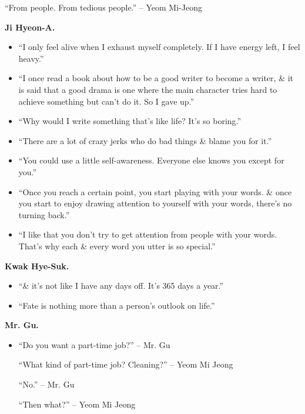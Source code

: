 \documentclass{article}
\begin{document}
\begin{enumerate}
\begin{itemize}
		``From people. From tedious people.'' -- Yeom Mi-Jeong
	\end{itemize}
	{\bf Ji Hyeon-A.}
	\begin{itemize}
		\item ``I only feel alive when I exhaust myself completely. If I have energy left, I feel heavy.''
		\item ``I once read a book about how to be a good writer to become a writer, \& it is said that a good drama is one where the main character tries hard to achieve something but can't do it. So I gave up.''
		\item ``Why would I write something that's like life? It's so boring.''
		\item ``There are a lot of crazy jerks who do bad things \& blame you for it.''
		\item ``You could use a little self-awareness. Everyone else knows you except for you.''
		\item ``Once you reach a certain point, you start playing with your words. \& once you start to enjoy drawing attention to yourself with your words, there's no turning back.''
		\item ``I like that you don't try to get attention from people with your words. That's why each \& every word you utter is so special.''
	\end{itemize}
	{\bf Kwak Hye-Suk.}
	\begin{itemize}
		\item ``\& it's not like I have any days off. It's 365 days a year.''
		\item ``Fate is nothing more than a person's outlook on life.''
	\end{itemize}
	{\bf Mr. Gu.}
	\begin{itemize}
		\item ``Do you want a part-time job?'' -- Mr. Gu
		
		``What kind of part-time job? Cleaning?'' -- Yeom Mi Jeong
		
		``No.'' -- Mr. Gu
		
		``Then what?'' -- Yeom Mi Jeong
		

\end{itemize}
\end{enumerate}
\end{document}
